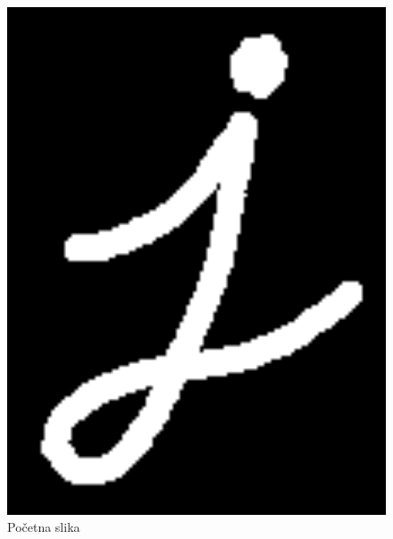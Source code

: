 \documentclass[fontsize=12bp, paper=a4]{scrarticle}
\begin{document}
\begin{figure}[tbp!]
    \centering
    \begin{minipage}[b]{0.25\textwidth}
        \includegraphics[width=1\textwidth]{3.png}
        \caption{\centering Početna slika}
    \end{minipage}
    \begin{minipage}[b]{0.25\textwidth}

\end{minipage}
\end{figure}
\end{document}
